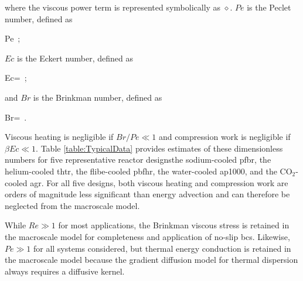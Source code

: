 \noindent where the viscous power term is represented symbolically as \(\diamond\). \(Pe\) is the Peclet number, defined as

\beq
\label{eq:PecletDef}
Pe\equiv{}\ ;
\eeq


\noindent\(Ec\) is the Eckert number, defined as

\beq
\label{eq:EcNumber}
Ec=\ ;
\eeq

\noindent and \(Br\) is the Brinkman number, defined as

\beq
\label{eq:BrNumber}
Br=\ .
\eeq

\noindent Viscous heating is negligible if \(Br/Pe\ll1\) and compression work is negligible if \(\beta Ec\ll1\). Table \ref{table:TypicalData} provides estimates of these dimensionless numbers for five representative reactor designs\mdash the sodium-cooled \gls{pfbr}, the helium-cooled \gls{thtr}, the \gls{flibe}-cooled \gls{pbfhr}, the water-cooled \gls{ap1000}, and the CO$_2$-cooled \gls{agr}. For all five designs, both viscous heating and compression work are orders of magnitude less significant than energy advection and can therefore be neglected from the macroscale model.

While \(Re\gg1\) for most applications, the Brinkman viscous stress is retained in the macroscale model for completeness and application of no-slip \glspl{bc}. Likewise, \(Pe\gg1\) for all systems considered, but thermal energy conduction is retained in the macroscale model because the gradient diffusion model for thermal dispersion always requires a diffusive kernel.

